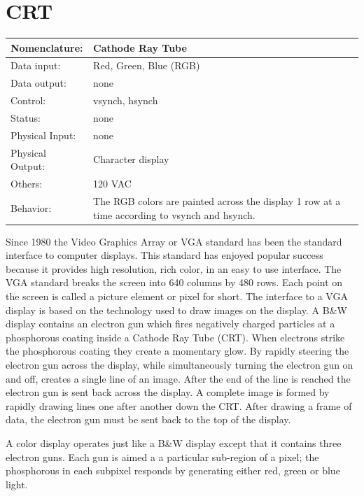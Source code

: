 \section{CRT}
\label{page:crt}
\begin{tabular}{|l|p{3.5in}|} \hline
Nomenclature:  & Cathode Ray Tube  \\ \hline
Data input:    & Red, Green, Blue (RGB)   \\ \hline
Data output:   & none     \\ \hline
Control:       & vsynch, hsynch     \\ \hline
Status:        & none      \\ \hline
Physical Input:& none		\\ \hline
Physical Output:& Character display	\\ \hline
Others:        & 120 VAC     \\ \hline
Behavior:      & The RGB colors are painted across the display 1 row 
at a time according to vsynch and hsynch. \\ \hline
\end{tabular}


Since 1980 the Video Graphics Array or VGA standard has been the 
standard interface to computer displays. This standard has enjoyed 
popular success because it provides high resolution, rich color, 
in an easy to use interface. The VGA standard breaks the screen 
into 640 columns by 480 rows. Each point on the screen is called a 
picture element or pixel for short. The interface to a VGA display 
is based on the technology used to draw images on the display. A 
B\&W display contains an electron gun which fires negatively charged 
particles at a phosphorous coating inside a Cathode Ray Tube (CRT). 
When electrons strike the phosphorous coating they create a momentary 
glow. By rapidly steering the electron gun across the display, while 
simultaneously turning the electron gun on and off, creates a single 
line of an image. After the end of the line is reached the electron 
gun is sent back across the display. A complete image is formed by 
rapidly drawing lines one after another down the CRT. After drawing 
a frame of data, the electron gun must be sent back to the top of the 
display.

A color display operates just like a B\&W display except that it contains 
three electron guns. Each gun is aimed a a particular sub-region of a 
pixel; the phosphorous in each subpixel responds by generating either 
red, green or blue light.

